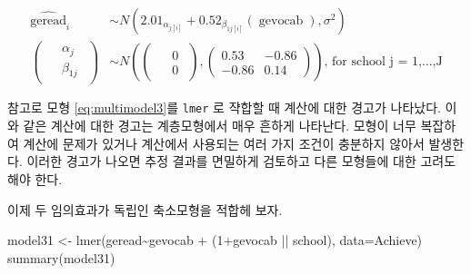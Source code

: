 \documentclass[
]{book}
\newenvironment{Shaded}{\begin{snugshade}}{\end{snugshade}}
\newcommand{\AttributeTok}[1]{\textcolor[rgb]{0.77,0.63,0.00}{#1}}
\newcommand{\DecValTok}[1]{\textcolor[rgb]{0.00,0.00,0.81}{#1}}
\newcommand{\FunctionTok}[1]{\textcolor[rgb]{0.00,0.00,0.00}{#1}}
\newcommand{\NormalTok}[1]{#1}
\newcommand{\OtherTok}[1]{\textcolor[rgb]{0.56,0.35,0.01}{#1}}
\newcommand{\SpecialCharTok}[1]{\textcolor[rgb]{0.00,0.00,0.00}{#1}}
\begin{document}
\[
\begin{aligned}
  \operatorname{\widehat{geread}}_{i}  &\sim N \left(2.01_{\alpha_{j[i]}} + 0.52_{\beta_{1j[i]}}(\operatorname{gevocab}), \sigma^2 \right) \\    
\left(
  \begin{array}{c} 
    \begin{aligned}
      &\alpha_{j} \\
      &\beta_{1j}
    \end{aligned}
  \end{array}
\right)
  &\sim N \left(
\left(
  \begin{array}{c} 
    \begin{aligned}
      &0 \\
      &0
    \end{aligned}
  \end{array}
\right)
, 
\left(
  \begin{array}{cc}
     0.53 & -0.86 \\ 
     -0.86 & 0.14
  \end{array}
\right)
 \right)
    \text{, for school j = 1,} \dots \text{,J}
\end{aligned}
\]

참고로 모형 \eqref{eq:multimodel3}를 \texttt{lmer} 로 쟉합할 때 계산에 대한 경고가 나타났다. 이와 같은 계산에 대한 경고는 계층모형에서 매우 흔하게 나타난다. 모형이 너무 복잡하여 계산에 문제가 있거나 계산에서 사용되는 여러 가지 조건이 충분하지 않아서 발생한다. 이러한 경고가 나오면 추정 결과를 면밀하게 검토하고 다른 모형들에 대한 고려도 해야 한다.

이제 두 임의효과가 독립인 축소모형을 적합헤 보자.

\begin{Shaded}
\begin{Highlighting}[]
\NormalTok{model31 }\OtherTok{\textless{}{-}} \FunctionTok{lmer}\NormalTok{(geread}\SpecialCharTok{\textasciitilde{}}\NormalTok{gevocab }\SpecialCharTok{+}\NormalTok{  (}\DecValTok{1}\SpecialCharTok{+}\NormalTok{gevocab }\SpecialCharTok{||}\NormalTok{ school), }\AttributeTok{data=}\NormalTok{Achieve)}
\FunctionTok{summary}\NormalTok{(model31)}
\end{Highlighting}
\end{Shaded}
\end{document}
